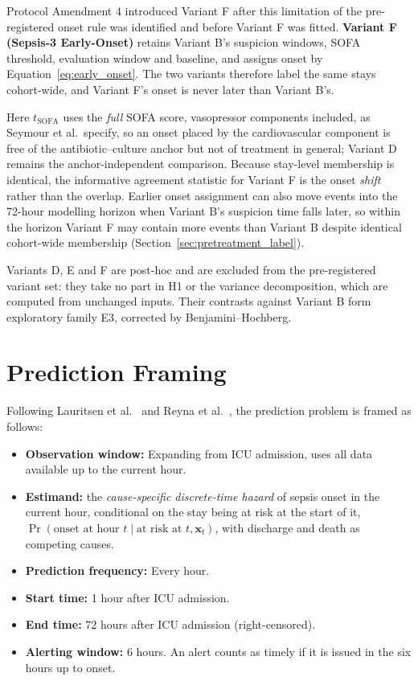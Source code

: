 Protocol Amendment 4 introduced Variant F after this limitation of the
pre-registered onset rule was identified and before Variant F was fitted.
\textbf{Variant F (Sepsis-3 Early-Onset)} retains Variant B's suspicion
windows, SOFA threshold, evaluation window and baseline, and assigns onset by
Equation~\eqref{eq:early_onset}. The two variants therefore label the same
stays cohort-wide, and Variant F's onset is never later than Variant B's.

Here $t_{\text{SOFA}}$ uses the \emph{full} SOFA score, vasopressor components
included, as Seymour et al.\ specify, so an onset placed by the cardiovascular
component is free of the antibiotic--culture anchor but not of treatment in
general; Variant D remains the anchor-independent comparison. Because
stay-level membership is identical, the informative agreement statistic for
Variant F is the onset \emph{shift} rather than the overlap. Earlier onset
assignment can also move events into the 72-hour modelling horizon when
Variant B's suspicion time falls later, so within the horizon Variant F may
contain more events than Variant B despite identical cohort-wide membership
(Section~\ref{sec:pretreatment_label}).

Variants D, E and F are post-hoc and are excluded from the pre-registered
variant set: they take no part in H1 or the variance decomposition, which are
computed from unchanged inputs. Their contrasts against Variant B form
exploratory family E3, corrected by Benjamini--Hochberg.


\section{Prediction Framing}
\label{sec:framing}

Following Lauritsen et al.\ \cite{lauritsen2021framing} and Reyna et al.\
\cite{reyna2020utility}, the prediction problem is framed as follows:

\begin{itemize}
    \item \textbf{Observation window:} Expanding from ICU admission, uses all
    data available up to the current hour.
    \item \textbf{Estimand:} the \emph{cause-specific discrete-time hazard} of
    sepsis onset in the current hour, conditional on the stay being at risk at
    the start of it, $\Pr(\text{onset at hour } t \mid \text{at risk at } t,
    \mathbf{x}_t)$, with discharge and death as competing causes.
    \item \textbf{Prediction frequency:} Every hour.
    \item \textbf{Start time:} 1 hour after ICU admission.
    \item \textbf{End time:} 72 hours after ICU admission (right-censored).
    \item \textbf{Alerting window:} 6 hours. An alert counts as timely if it is
    issued in the six hours up to onset.
\end{itemize}

